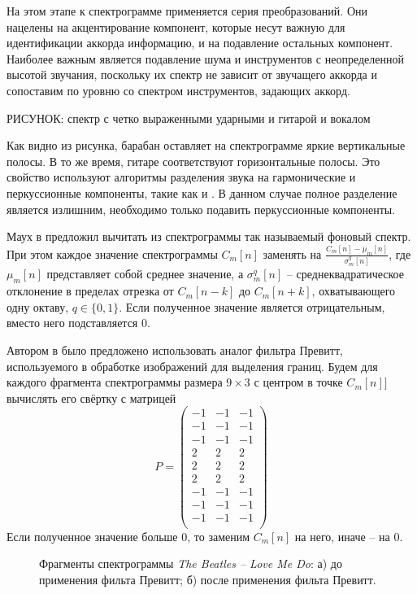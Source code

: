На этом этапе к спектрограмме применяется серия преобразований. Они нацелены на
акцентирование компонент, которые несут важную для идентификации аккорда
информацию, и на подавление остальных компонент. Наиболее важным является
подавление шума и инструментов с неопределенной высотой звучания, поскольку их
спектр не зависит от звучащего аккорда и сопоставим по уровню со спектром
инструментов, задающих аккорд.

РИСУНОК: спектр с четко выраженными ударными и гитарой и вокалом

Как видно из рисунка, барабан оставляет на спектрограмме яркие вертикальные
полосы. В то же время, гитаре соответствуют горизонтальные полосы. Это свойство
используют алгоритмы разделения звука на гармонические и перкуссионные
компоненты, такие как \cite{Ono2008} и \cite{Fitzgerald2010}. В данном случае
полное разделение является излишним, необходимо только подавить перкуссионные
компоненты.

Маух в \cite{Mauch2010} предложил вычитать из спектрограммы так называемый
фоновый спектр. При этом каждое значение спектрограммы $C_m[n]$ заменять на
$\frac{C_m[n] - \mu_m[n]}{\sigma_m^q[n]}$, где $\mu_m[n]$ представляет собой
среднее значение, а $\sigma_m^q[n]$ -- среднеквадратическое отклонение в
пределах отрезка от $C_m[n-k]$ до $C_m[n+k]$, охватывающего одну октаву, $q \in
\{0, 1\}$. Если полученное значение является отрицательным, вместо него
подставляется 0.

Автором в \cite{Glazyrin2012} было предложено использовать аналог фильтра
Превитт, используемого в обработке изображений для выделения границ. Будем
для каждого фрагмента спектрограммы размера $9 \times 3$ с центром в точке
$C_m[n]]$ вычислять его свёртку с матрицей
$$P = \begin{pmatrix}
-1 & -1 & -1\\
-1 & -1 & -1\\
-1 & -1 & -1\\
2 & 2 & 2\\
2 & 2 & 2\\
2 & 2 & 2\\
-1 & -1 & -1\\
-1 & -1 & -1\\
-1 & -1 & -1\\
\end{pmatrix}$$
Если полученное значение больше 0, то заменим $C_m[n]$ на него, иначе -- на 0.

\begin{figure}[h]
  \begin{minipage}[h]{0.49\linewidth}
  \end{minipage}
  \hfill
  \begin{minipage}[h]{0.49\linewidth}
  \end{minipage}
  \caption{Фрагменты спектрограммы \emph{The Beatles -- Love Me Do}: а)
  до применения фильта Превитт; б) после применения фильта Превитт.}
  \label{img:spectb}  
\end{figure}

